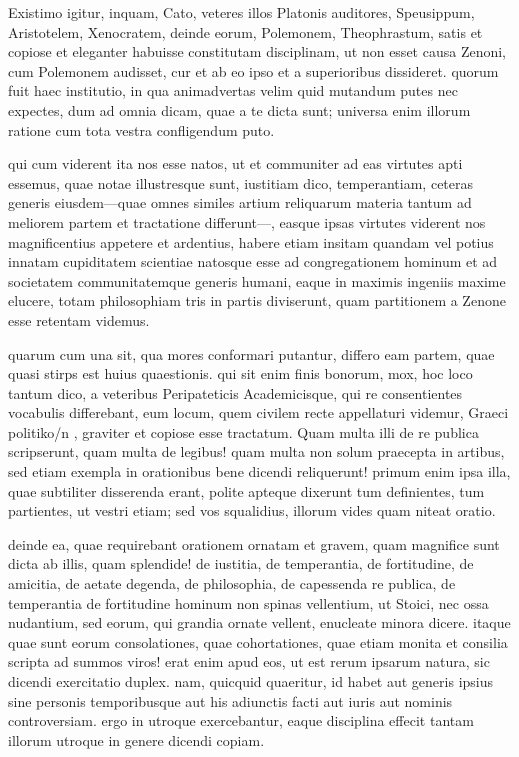  Existimo igitur, inquam, Cato, veteres illos Platonis auditores, Speusippum, Aristotelem, Xenocratem, deinde eorum, Polemonem, Theophrastum, satis et copiose et eleganter habuisse constitutam disciplinam, ut non esset causa Zenoni, cum Polemonem audisset, cur et ab eo ipso et a superioribus dissideret. quorum fuit haec institutio, in qua animadvertas velim quid mutandum putes nec expectes, dum ad omnia dicam, quae a te dicta sunt; universa enim illorum ratione cum tota vestra confligendum puto.

 qui cum viderent ita nos esse natos, ut et communiter ad eas virtutes apti essemus, quae notae illustresque sunt, iustitiam dico, temperantiam, ceteras generis eiusdem—quae omnes similes artium reliquarum materia tantum ad meliorem partem et tractatione differunt—, easque ipsas virtutes viderent nos magnificentius appetere et ardentius, habere etiam insitam quandam vel potius innatam cupiditatem scientiae natosque esse ad congregationem hominum et ad societatem communitatemque generis humani, eaque in maximis ingeniis maxime elucere, totam philosophiam tris in partis diviserunt, quam partitionem a Zenone esse retentam videmus.

 quarum cum una sit, qua mores conformari putantur, differo eam partem, quae quasi stirps est huius quaestionis. qui sit enim finis bonorum, mox, hoc loco tantum dico, a veteribus Peripateticis Academicisque, qui re consentientes vocabulis differebant, eum locum, quem civilem recte appellaturi videmur, Graeci politiko/n , graviter et copiose esse tractatum. Quam multa illi de re publica scripserunt, quam multa de legibus! quam multa non solum praecepta in artibus, sed etiam exempla in orationibus bene dicendi reliquerunt! primum enim ipsa illa, quae subtiliter disserenda erant, polite apteque dixerunt tum definientes, tum partientes, ut vestri etiam; sed vos squalidius, illorum vides quam niteat oratio.

 deinde ea, quae requirebant orationem ornatam et gravem, quam magnifice sunt dicta ab illis, quam splendide! de iustitia, de temperantia, de fortitudine, de amicitia, de aetate degenda, de philosophia, de capessenda re publica, de temperantia de fortitudine hominum non spinas vellentium, ut Stoici, nec ossa nudantium, sed eorum, qui grandia ornate vellent, enucleate minora dicere. itaque quae sunt eorum consolationes, quae cohortationes, quae etiam monita et consilia scripta ad summos viros! erat enim apud eos, ut est rerum ipsarum natura, sic dicendi exercitatio duplex. nam, quicquid quaeritur, id habet aut generis ipsius sine personis temporibusque aut his adiunctis facti aut iuris aut nominis controversiam. ergo in utroque exercebantur, eaque disciplina effecit tantam illorum utroque in genere dicendi copiam.

